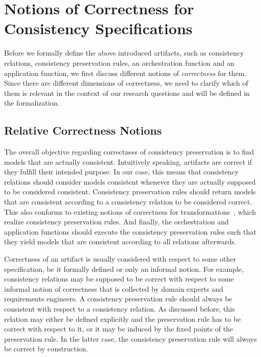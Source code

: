 \section{Notions of Correctness for Consistency Specifications}
\label{chap:correctness:notions_correctness}

Before we formally define the above introduced artifacts, such as consistency relations, consistency preservation rules, an orchestration function and an application function, we first discuss different notions of \emph{correctness} for them.
Since there are different dimensions of correctness, we need to clarify which of them is relevant in the context of our research questions and will be defined in the formalization.


\subsection{Relative Correctness Notions}

The overall objective regarding correctness of consistency preservation is to find models that are actually consistent.
Intuitively speaking, artifacts are correct if they fulfill their intended purpose. 
In our case, this means that consistency relations should consider models consistent whenever they are actually supposed to be considered consistent.
Consistency preservation rules should return models that are consistent according to a consistency relation to be considered correct.
This also conforms to existing notions of correctness for transformations~\cite{stevens2010sosym}, which realize consistency preservation rules.
And finally, the orchestration and application functions should execute the consistency preservation rules such that they yield models that are consistent according to all relations afterwards.

Correctness of an artifact is usually considered with respect to some other specification, be it formally defined or only an informal notion.
For example, consistency relations may be supposed to be correct with respect to some informal notion of correctness that is collected by domain experts and requirements engineers.
A consistency preservation rule should always be consistent with respect to a consistency relation. As discussed before, this relation may either be defined explicitly and the preservation rule has to be correct with respect to it, or it may be induced by the fixed points of the preservation rule.
In the latter case, the consistency preservation rule will always be correct by construction.


